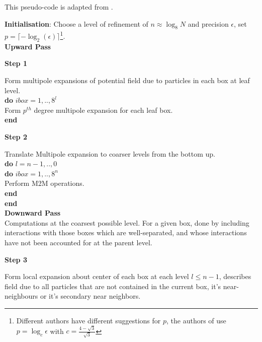 \label{app:analytic_fmm}

This pseudo-code is adapted from \cite{Greengard:1987:Yale}.

\hfill


\textbf{Initialisation}: Choose a level of refinement of $n \approx \log_8 N$
and precision $\epsilon$, set $p= \lceil -\log_2(\epsilon) \rceil$\footnote{
    Different authors have different suggestions for $p$, the authors
    of \cite{Ying:2004:JCP} use $p = \log_c \epsilon$ with $c=\frac{4-\sqrt{3}}{\sqrt{3}}$
}. \\

\textbf{Upward Pass}
\begin{center}
    \textbf{Step 1}
\end{center}
Form multipole expansions of potential field due to particles in each box at
leaf level. \\

\noindent \textbf{do} $\textit{ibox}=1,..,8^l$ \\
\indent   Form $p^{th}$ degree multipole expansion for each leaf box.\\
\noindent \textbf{end}

\begin{center}
    \textbf{Step 2}
\end{center}

Translate Multipole expansion to coarser levels from the bottom up.\\

\noindent \textbf{do} $l=n-1,..,0$ \\
\indent \textbf{do} $\textit{ibox}=1,..,8^n$ \\
\indent \indent Perform M2M operations. \\
\indent \textbf{end} \\
\noindent \textbf{end} \\

\textbf{Downward Pass} \\

Computations at the coarsest possible level. For a given box, done by including
interactions with those boxes which are \gls{well-separated}, and whose interactions
have not been accounted for at the parent level.

\begin{center}
    \textbf{Step 3}
\end{center}

Form local expansion about center of each box at each level $l \leq n-1$, describes
field due to all particles that are not contained in the current box, it's \gls{near-neighbours}
or it's secondary near neighbors.

